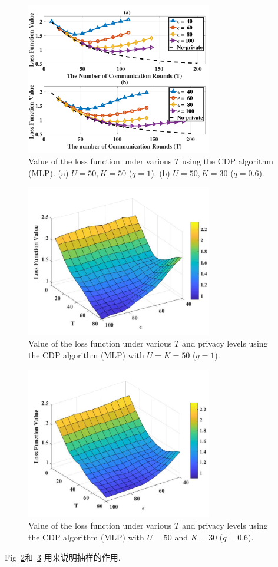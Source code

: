     \begin{figure}[ht]
    \centering
    \includegraphics[width=3.2in,angle=0]{figures/CDP/ConvforKandN_T.pdf}
    \caption{Value of the loss function under various $T$ using the CDP algorithm (MLP). (a) $U=50, K=50$ ($q=1$). (b) $U=50, K=30$ ($q=0.6$).}
    \label{fig:MLP_ConvforNandK_T}
    \end{figure}

    \begin{figure}[ht]
    \centering
    \includegraphics[width=3.2in,angle=0]{figures/CDP/ConvforN_T_eps_td.pdf}
    \caption{Value of the loss function under various $T$ and privacy levels using the CDP algorithm (MLP) with $U=K=50$ ($q=1$).}
    \label{fig:ConvforN_T_eps_td}
    \end{figure}

    \begin{figure}[ht]
    \centering
    \includegraphics[width=3.2in,angle=0]{figures/CDP/ConvforK_T_eps_td.pdf}
    \caption{Value of the loss function under various $T$ and privacy levels using the CDP algorithm (MLP) with $U=50$ and $K=30$ ($q=0.6$).}
    \label{fig:ConvforK_T_eps_td}
    \end{figure}
    Fig~\ref{fig:ConvforN_T_eps_td}和~\ref{fig:ConvforK_T_eps_td} 用来说明抽样的作用.

